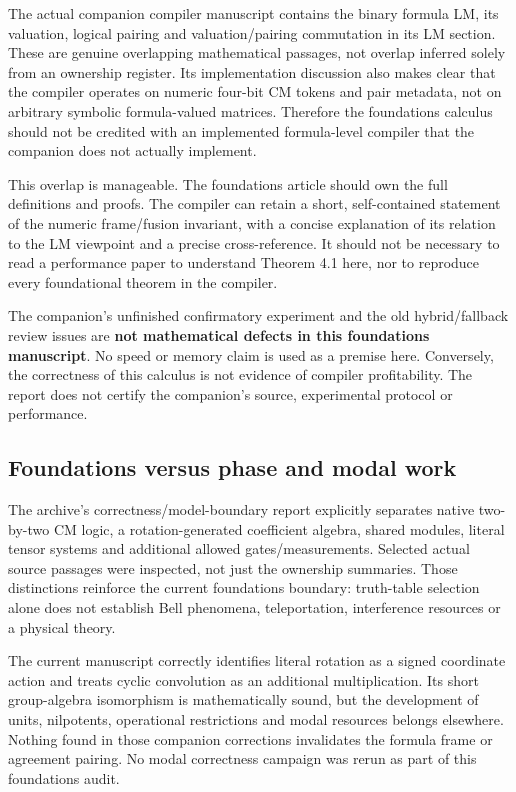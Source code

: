 \documentclass[
  10pt,
]{article}
\begin{document}
The actual companion compiler manuscript contains the binary formula LM,
its valuation, logical pairing and valuation/pairing commutation in its
LM section. These are genuine overlapping mathematical passages, not
overlap inferred solely from an ownership register. Its implementation
discussion also makes clear that the compiler operates on numeric
four-bit CM tokens and pair metadata, not on arbitrary symbolic
formula-valued matrices. Therefore the foundations calculus should not
be credited with an implemented formula-level compiler that the
companion does not actually implement.

This overlap is manageable. The foundations article should own the full
definitions and proofs. The compiler can retain a short, self-contained
statement of the numeric frame/fusion invariant, with a concise
explanation of its relation to the LM viewpoint and a precise
cross-reference. It should not be necessary to read a performance paper
to understand Theorem 4.1 here, nor to reproduce every foundational
theorem in the compiler.

The companion's unfinished confirmatory experiment and the old
hybrid/fallback review issues are \textbf{not mathematical defects in
this foundations manuscript}. No speed or memory claim is used as a
premise here. Conversely, the correctness of this calculus is not
evidence of compiler profitability. The report does not certify the
companion's source, experimental protocol or performance.

\subsection{Foundations versus phase and modal
work}\label{foundations-versus-phase-and-modal-work}

The archive's correctness/model-boundary report explicitly separates
native two-by-two CM logic, a rotation-generated coefficient algebra,
shared modules, literal tensor systems and additional allowed
gates/measurements. Selected actual source passages were inspected, not
just the ownership summaries. Those distinctions reinforce the current
foundations boundary: truth-table selection alone does not establish
Bell phenomena, teleportation, interference resources or a physical
theory.

The current manuscript correctly identifies literal rotation as a signed
coordinate action and treats cyclic convolution as an additional
multiplication. Its short group-algebra isomorphism is mathematically
sound, but the development of units, nilpotents, operational
restrictions and modal resources belongs elsewhere. Nothing found in
those companion corrections invalidates the formula frame or agreement
pairing. No modal correctness campaign was rerun as part of this
foundations audit.
\end{document}

